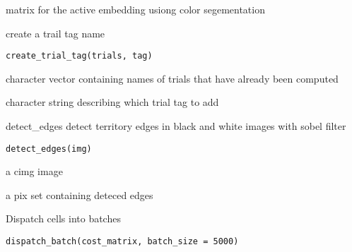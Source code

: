 \documentclass[a4paper]{book}
\begin{document}
%
\begin{Value}
matrix for the active embedding usiong color segementation
\end{Value}
%
\begin{Description}
create a trail tag name
\end{Description}
%
\begin{Usage}
\begin{verbatim}
create_trial_tag(trials, tag)
\end{verbatim}
\end{Usage}
%
\begin{Arguments}
\begin{ldescription}
\item[\code{trials}] character vector containing names of trials 
that have already been computed

\item[\code{tag}] character string describing which trial tag to add
\end{ldescription}
\end{Arguments}
%
\begin{Description}
detect\_edges
detect territory edges in black and white images with sobel filter
\end{Description}
%
\begin{Usage}
\begin{verbatim}
detect_edges(img)
\end{verbatim}
\end{Usage}
%
\begin{Arguments}
\begin{ldescription}
\item[\code{img}] a cimg image
\end{ldescription}
\end{Arguments}
%
\begin{Value}
a pix set containing deteced edges
\end{Value}
%
\begin{Description}
Dispatch cells into batches
\end{Description}
%
\begin{Usage}
\begin{verbatim}
dispatch_batch(cost_matrix, batch_size = 5000)
\end{verbatim}
\end{Usage}
\end{document}
